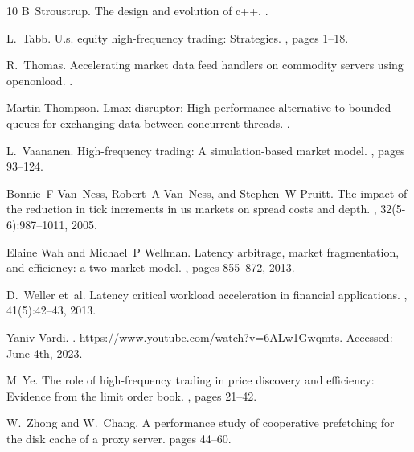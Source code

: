 \documentclass{article}
\theoremstyle{break}
\begin{document}
\begin{thebibliography}{10}
B~Stroustrup.
\newblock The design and evolution of c++.
.

L.~Tabb.
\newblock U.s. equity high-frequency trading: Strategies.
, pages 1--18.

R.~Thomas.
\newblock Accelerating market data feed handlers on commodity servers using openonload.
.

Martin Thompson.
\newblock Lmax disruptor: High performance alternative to bounded queues for exchanging data between concurrent threads.
.

L.~Vaananen.
\newblock High-frequency trading: A simulation-based market model.
, pages 93--124.

Bonnie~F Van~Ness, Robert~A Van~Ness, and Stephen~W Pruitt.
\newblock The impact of the reduction in tick increments in us markets on spread costs and depth.
, 32(5-6):987--1011, 2005.

Elaine Wah and Michael~P Wellman.
\newblock Latency arbitrage, market fragmentation, and efficiency: a two-market model.
, pages 855--872, 2013.

D.~Weller et~al.
\newblock Latency critical workload acceleration in financial applications.
, 41(5):42--43, 2013.

{Yaniv Vardi}.
.
\newblock \url{https://www.youtube.com/watch?v=6ALw1Gwqmts}.
\newblock Accessed: June 4th, 2023.

M~Ye.
\newblock The role of high-frequency trading in price discovery and efficiency: Evidence from the limit order book.
, pages 21--42.

W.~Zhong and W.~Chang.
\newblock A performance study of cooperative prefetching for the disk cache of a proxy server.
\newblock pages 44--60.

\end{thebibliography}
\end{document}
